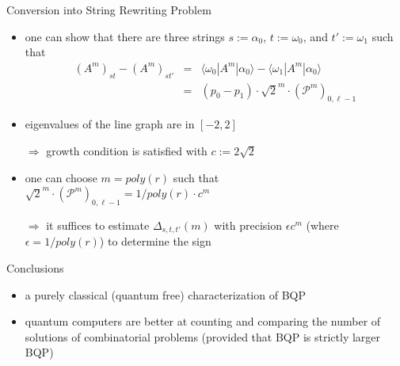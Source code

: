 \documentclass[slideColor]{prosper}
\newcommand{\cP}{{\mathcal{P}}}
\renewcommand{\>}{\rangle}
\newcommand{\<}{\langle}
\begin{document}
\begin{slide}{Conversion into String Rewriting Problem}
\begin{itemize}
\item one can show that there are three strings $s:=\alpha_0$, $t:=\omega_0$, and $t':=\omega_1$ such that
\begin{eqnarray*}
(A^m)_{st} - (A^m)_{st'} & = & 
\<\omega_0|A^m|\alpha_0\> - \<\omega_1|A^m|\alpha_0\> \\
& = & 
(p_0 - p_1) \cdot \sqrt{2}^m \cdot (\cP^m)_{0,\ell-1}
\end{eqnarray*}

\item eigenvalues of the line graph are in $[-2,2]$

\medskip
$\Rightarrow$ growth condition is satisfied with $c:=2\sqrt{2}$

\item one can choose $m=poly(r)$ such that $\sqrt{2}^m \cdot (\cP^m)_{0,\ell-1} = 1/poly(r) \cdot c^m$

\medskip
$\Rightarrow$ it suffices to estimate $\Delta_{s,t,t'}(m)$ with precision $\epsilon c^m$ (where $\epsilon=1/poly(r)$) to determine the sign
\end{itemize}
\end{slide}


\begin{slide}{Conclusions}
\begin{itemize}
\item a purely classical (quantum free) characterization of BQP
\item quantum computers are better at counting and comparing the number of solutions of combinatorial problems (provided that BQP is strictly larger BQP)
\end{itemize}
\end{slide}
\end{document}

